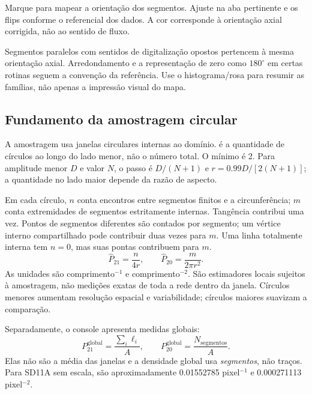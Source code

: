 Marque  para mapear a orientação dos segmentos. Ajuste  na aba pertinente e os flips conforme o referencial dos dados. A cor corresponde à orientação axial corrigida, não ao sentido de fluxo.

Segmentos paralelos com sentidos de digitalização opostos pertencem à mesma orientação axial. Arredondamento e a representação de zero como \(180^\circ\) em certas rotinas seguem a convenção da referência. Use o histograma/rosa para resumir as famílias, não apenas a impressão visual do mapa.

\subsection{Fundamento da amostragem circular}\label{sec:circular}
A amostragem usa janelas circulares internas ao domínio.  é a quantidade de círculos ao longo do lado menor, não o número total. O mínimo é 2. Para amplitude menor \(D\) e valor \(N\), o passo é \(D/(N+1)\) e \(r=0.99D/[2(N+1)]\); a quantidade no lado maior depende da razão de aspecto.

Em cada círculo, \(n\) conta encontros entre segmentos finitos e a circunferência; \(m\) conta extremidades de segmentos estritamente internas. Tangência contribui uma vez. Pontos de segmentos diferentes são contados por segmento; um vértice interno compartilhado pode contribuir duas vezes para \(m\). Uma linha totalmente interna tem \(n=0\), mas suas pontas contribuem para \(m\).
\begin{equation}
\widehat P_{21}=\frac{n}{4r},\qquad
\widehat P_{20}=\frac{m}{2\pi r^2}.
\label{eq:circle}
\end{equation}
As unidades são comprimento\(^{-1}\) e comprimento\(^{-2}\). São estimadores locais sujeitos à amostragem, não medições exatas de toda a rede dentro da janela. Círculos menores aumentam resolução espacial e variabilidade; círculos maiores suavizam a comparação.

Separadamente, o console apresenta medidas globais:
\begin{equation}
P_{21}^{\mathrm{global}}=\frac{\sum_i\ell_i}{A},\qquad
P_{20}^{\mathrm{global}}=\frac{N_{\mathrm{segmentos}}}{A}.
\end{equation}
Elas não são a média das janelas e a densidade global usa \emph{segmentos}, não traços. Para SD11A sem escala, são aproximadamente 0.01552785 pixel\(^{-1}\) e 0.000271113 pixel\(^{-2}\).

